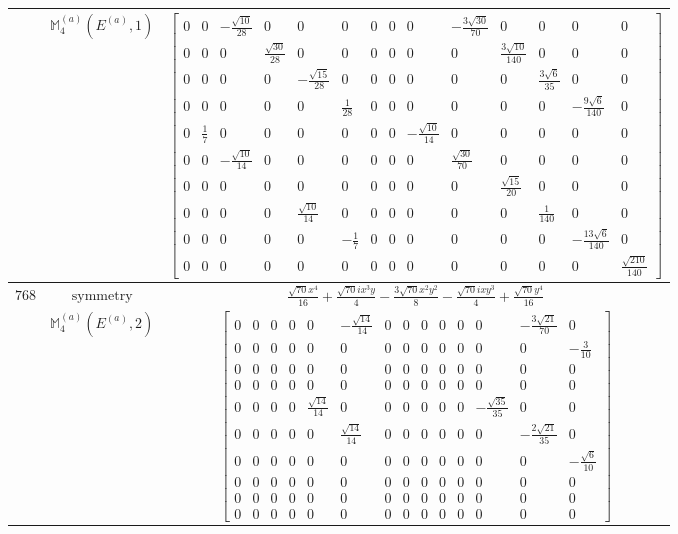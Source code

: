 \documentclass[fleqn,8pt,landscape]{jsarticle}
\begin{document}
\begin{longtable}{ccc}
$  $ & $ \mathbb{M}_{4}^{(a)}(E^{(a)},1) $ & $ \begin{bmatrix} 0 & 0 & - \frac{\sqrt{10}}{28} & 0 & 0 & 0 & 0 & 0 & 0 & - \frac{3 \sqrt{30}}{70} & 0 & 0 & 0 & 0 \\ 0 & 0 & 0 & \frac{\sqrt{30}}{28} & 0 & 0 & 0 & 0 & 0 & 0 & \frac{3 \sqrt{10}}{140} & 0 & 0 & 0 \\ 0 & 0 & 0 & 0 & - \frac{\sqrt{15}}{28} & 0 & 0 & 0 & 0 & 0 & 0 & \frac{3 \sqrt{6}}{35} & 0 & 0 \\ 0 & 0 & 0 & 0 & 0 & \frac{1}{28} & 0 & 0 & 0 & 0 & 0 & 0 & - \frac{9 \sqrt{6}}{140} & 0 \\ 0 & \frac{1}{7} & 0 & 0 & 0 & 0 & 0 & 0 & - \frac{\sqrt{10}}{14} & 0 & 0 & 0 & 0 & 0 \\ 0 & 0 & - \frac{\sqrt{10}}{14} & 0 & 0 & 0 & 0 & 0 & 0 & \frac{\sqrt{30}}{70} & 0 & 0 & 0 & 0 \\ 0 & 0 & 0 & 0 & 0 & 0 & 0 & 0 & 0 & 0 & \frac{\sqrt{15}}{20} & 0 & 0 & 0 \\ 0 & 0 & 0 & 0 & \frac{\sqrt{10}}{14} & 0 & 0 & 0 & 0 & 0 & 0 & \frac{1}{140} & 0 & 0 \\ 0 & 0 & 0 & 0 & 0 & - \frac{1}{7} & 0 & 0 & 0 & 0 & 0 & 0 & - \frac{13 \sqrt{6}}{140} & 0 \\ 0 & 0 & 0 & 0 & 0 & 0 & 0 & 0 & 0 & 0 & 0 & 0 & 0 & \frac{\sqrt{210}}{140} \end{bmatrix} $ \\ \hline
$ 768 $ & $ \text{symmetry} $ & $ \frac{\sqrt{70} x^{4}}{16} + \frac{\sqrt{70} i x^{3} y}{4} - \frac{3 \sqrt{70} x^{2} y^{2}}{8} - \frac{\sqrt{70} i x y^{3}}{4} + \frac{\sqrt{70} y^{4}}{16} $ \\
$  $ & $ \mathbb{M}_{4}^{(a)}(E^{(a)},2) $ & $ \begin{bmatrix} 0 & 0 & 0 & 0 & 0 & - \frac{\sqrt{14}}{14} & 0 & 0 & 0 & 0 & 0 & 0 & - \frac{3 \sqrt{21}}{70} & 0 \\ 0 & 0 & 0 & 0 & 0 & 0 & 0 & 0 & 0 & 0 & 0 & 0 & 0 & - \frac{3}{10} \\ 0 & 0 & 0 & 0 & 0 & 0 & 0 & 0 & 0 & 0 & 0 & 0 & 0 & 0 \\ 0 & 0 & 0 & 0 & 0 & 0 & 0 & 0 & 0 & 0 & 0 & 0 & 0 & 0 \\ 0 & 0 & 0 & 0 & \frac{\sqrt{14}}{14} & 0 & 0 & 0 & 0 & 0 & 0 & - \frac{\sqrt{35}}{35} & 0 & 0 \\ 0 & 0 & 0 & 0 & 0 & \frac{\sqrt{14}}{14} & 0 & 0 & 0 & 0 & 0 & 0 & - \frac{2 \sqrt{21}}{35} & 0 \\ 0 & 0 & 0 & 0 & 0 & 0 & 0 & 0 & 0 & 0 & 0 & 0 & 0 & - \frac{\sqrt{6}}{10} \\ 0 & 0 & 0 & 0 & 0 & 0 & 0 & 0 & 0 & 0 & 0 & 0 & 0 & 0 \\ 0 & 0 & 0 & 0 & 0 & 0 & 0 & 0 & 0 & 0 & 0 & 0 & 0 & 0 \\ 0 & 0 & 0 & 0 & 0 & 0 & 0 & 0 & 0 & 0 & 0 & 0 & 0 & 0 \end{bmatrix} $ \\ \hline

\end{longtable}
\end{document}
